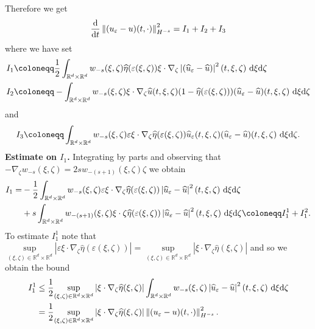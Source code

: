 \documentclass[11pt,reqno]{amsart}
\numberwithin{equation}{section}
\def\dd{{\rm d}}
\begin{document}
Therefore we get  
\begin{align*}
\frac{\dd}{\dd t}\left\Vert (u_{\varepsilon}-u)(t,\cdot)\right\Vert_{H^{-s}}^{2}=I_{1}+I_{2}+I_{3}     
\end{align*}
where we have set 
\begin{align*}
&I_{1}\coloneqq  \frac{1}{2}\int_{\mathbb{R}^{d}\times \mathbb{R}^{d}}w_{-s}(\xi,\zeta)\widehat{\eta}(\varepsilon(\xi,\zeta))\xi\cdot \nabla_{\zeta}\left\vert (\widehat{u}_{\varepsilon}-\widehat{u})\right\vert^{2}(t,\xi,\zeta)\ \dd \xi\dd \zeta\\
&I_{2}\coloneqq -\int_{\mathbb{R}^{d}\times \mathbb{R}^{d}}w_{-s}(\xi,\zeta)\xi \cdot \nabla_{\zeta}\widehat{u}(t,\xi,\zeta)(1-\widehat{\eta}(\varepsilon(\xi,\zeta)))(\widehat{u}_{\varepsilon}-\widehat{u})(t,\xi,\zeta)\ \dd \xi\dd \zeta
\end{align*}
and 
\begin{align*}
I_{3}\coloneqq \int_{\mathbb{R}^{d}\times \mathbb{R}^{d}}w_{-s}(\xi,\zeta)\varepsilon \xi\cdot \nabla_{\zeta}\widehat{\eta}(\varepsilon(\xi,\zeta))\widehat{u}_{\varepsilon}(t,\xi,\zeta)(\widehat{u}_{\varepsilon}-\widehat{u})(t,\xi,\zeta)\ \dd \xi \dd \zeta.     
\end{align*}
\textbf{Estimate on $I_{1}$.} Integrating by parts and observing that $-\nabla_{\zeta}w_{-s}(\xi,\zeta)=2sw_{-(s+1)}(\xi,\zeta)\zeta$ we obtain 
\begin{align*}
I_{1}=&-\frac{1}{2}\int_{\mathbb{R}^{d}\times \mathbb{R}^{d}}w_{-s}(\xi,\zeta)\varepsilon \xi \cdot \nabla_{\zeta}\widehat{\eta}(\varepsilon(\xi,\zeta))\left\vert \widehat{u}_{\varepsilon}-\widehat{u}\right\vert^{2}(t,\xi,\zeta)\ \dd \xi\dd  \zeta\\
&+s\int_{\mathbb{R}^{d}\times \mathbb{R}^{d}}w_{-(s+1)}(\xi,\zeta)\xi\cdot \zeta \widehat{\eta}(\varepsilon(\xi,\zeta))\left\vert \widehat{u}_{\varepsilon}-\widehat{u}\right\vert^{2}(t,\xi,\zeta)\ \dd \xi \dd \zeta\coloneqq I_{1}^{1}+I_{1}^{2}.      \end{align*}
To estimate $I_{1}^{1}$ note that
$\underset{(\xi,\zeta)\in \mathbb{R}^{d}\times \mathbb{R}^{d}}{\sup}\left\vert \varepsilon \xi\cdot \nabla_{\zeta}\widehat{\eta}(\varepsilon(\xi,\zeta))\right\vert= \underset{(\xi,\zeta)\in \mathbb{R}^{d}\times \mathbb{R}^{d}}{\sup} \left\vert\xi \cdot \nabla_{\zeta}\widehat{\eta}(\xi,\zeta)\right\vert$ and so we obtain the bound 
\begin{align}
I_{1}^{1}&\leq \frac{1
}{2}\underset{(\xi,\zeta)\in \mathbb{R}^{d}\times \mathbb{R}^{d}}{\sup}\left\vert \xi \cdot \nabla_{\zeta}\widehat{\eta}(\xi,\zeta)\right\vert \int_{\mathbb{R}^{d}\times \mathbb{R}^{d}}w_{-s}(\xi,\zeta)\left\vert \widehat{u}_{\varepsilon}-\widehat{u}\right\vert^{2}(t,\xi,\zeta)\ \dd \xi\dd \zeta \notag\\
&=  \frac{1
}{2}\underset{(\xi,\zeta)\in \mathbb{R}^{d}\times \mathbb{R}^{d}}{\sup}\left\vert \xi \cdot \nabla_{\zeta}\widehat{\eta}(\xi,\zeta)\right\vert \left\Vert (u_{\varepsilon}-u)(t,\cdot)\right\Vert_{H^{-s}}^{2}.     \label{est on I11}  
\end{align}
\end{document}
